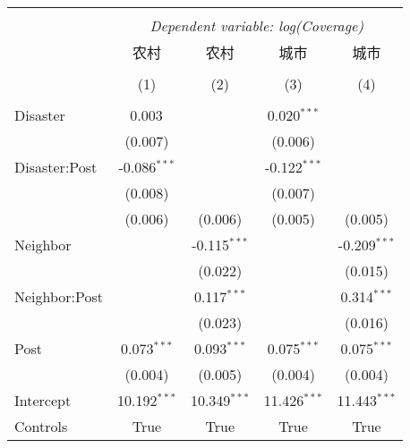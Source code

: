 
\begin{tabular}{@{\extracolsep{5pt}}lcccc}
\\[-1.8ex]\hline
\hline \\[-1.8ex]
& \multicolumn{4}{c}{\textit{Dependent variable: log(Coverage)}} \
\cr \cline{2-5}
\\[-1.8ex] & \multicolumn{1}{c}{农村} & \multicolumn{1}{c}{农村} & \multicolumn{1}{c}{城市} & \multicolumn{1}{c}{城市}  \\
\\[-1.8ex] & (1) & (2) & (3) & (4) \\
\hline \\[-1.8ex]
 Disaster & 0.003$^{}$ & & 0.020$^{***}$ & \\
& (0.007) & & (0.006) & \\
 Disaster:Post & -0.086$^{***}$ & & -0.122$^{***}$ & \\
& (0.008) & & (0.007) & \\
& (0.006) & (0.006) & (0.005) & (0.005) \\
 Neighbor & & -0.115$^{***}$ & & -0.209$^{***}$ \\
& & (0.022) & & (0.015) \\
 Neighbor:Post & & 0.117$^{***}$ & & 0.314$^{***}$ \\
& & (0.023) & & (0.016) \\
 Post & 0.073$^{***}$ & 0.093$^{***}$ & 0.075$^{***}$ & 0.075$^{***}$ \\
& (0.004) & (0.005) & (0.004) & (0.004) \\
Intercept & 10.192$^{***}$ & 10.349$^{***}$ & 11.426$^{***}$ & 11.443$^{***}$ \\
Controls & True & True & True & True \\

\end{tabular}
